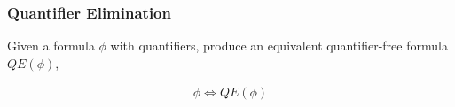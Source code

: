 \documentclass[
    aspectratio=169,
    xcolor={dvipsnames},
]{beamer}
\begin{document}
\begin{frame}
    \frametitle{Quantifier Elimination}


    Given a formula \(\phi\) with quantifiers, produce an equivalent
    quantifier-free formula \(QE(\phi)\),

    \begin{gather*}
        \phi \iff QE(\phi)
    \end{gather*}


    
    
    
    


\end{frame}
\end{document}
